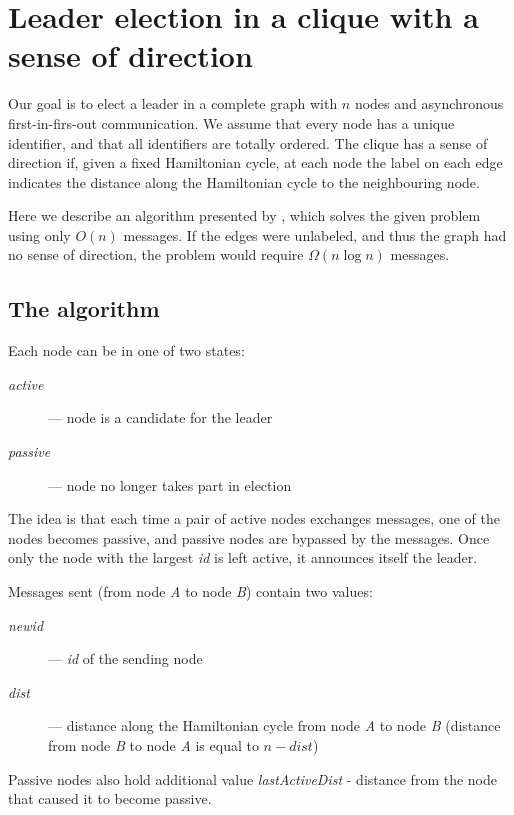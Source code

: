 \documentclass{article}
\begin{document}
\section*{Leader election in a clique with a sense of direction}

Our goal is to elect a leader in a complete graph with $n$ nodes and asynchronous first-in-firs-out communication. We assume that every node has a unique identifier, and that all identifiers are totally ordered. The clique has a sense of direction if, given a fixed Hamiltonian cycle, at each node the label on each edge indicates the distance along the Hamiltonian cycle to the neighbouring node.

Here we describe an algorithm presented by \cite{LOUI1986185}, which solves the given problem using only $O(n)$ messages. If the edges were unlabeled, and thus the graph had no sense of direction, the problem would require $\Omega (n\log n)$ messages.

\subsection*{The algorithm}
Each node can be in one of two states:
\begin{description}
    \item[\textit{active}] --- node is a candidate for the leader
    \item[\textit{passive}] --- node no longer takes part in election
\end{description}
The idea is that each time a pair of active nodes exchanges messages, one of the nodes becomes passive, and passive nodes are bypassed by the messages. Once only the node with the largest \textit{id} is left active, it announces itself the leader.

Messages sent (from node \textit{A} to node \textit{B}) contain two values:
\begin{description}
    \item[\textit{newid}] --- \textit{id} of the sending node
    \item[\textit{dist}] --- distance along the Hamiltonian cycle from node \textit{A} to node \textit{B} (distance from node \textit{B} to node \textit{A} is equal to $n-dist$)
\end{description}
Passive nodes also hold additional value \textit{lastActiveDist} - distance from the node that caused it to become passive.
\end{document}
